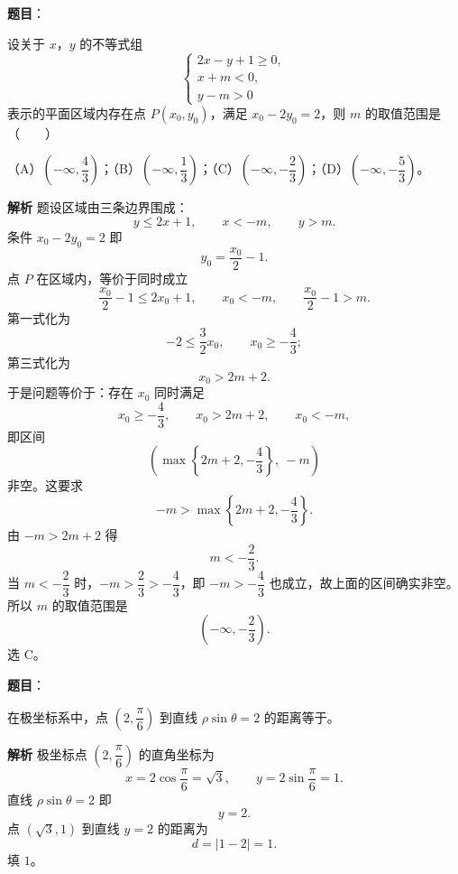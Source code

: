 \begin{answer}

\textbf{题目}：

设关于 $x$，$y$ 的不等式组
\nopagebreak[4]
\[\begin{cases}2x-y+1\geqslant0,\\ x+m<0,\\ y-m>0\end{cases}\]
表示的平面区域内存在点 $P(x_0,y_0)$，满足 $x_0-2y_0=2$，则 $m$ 的取值范围是\mbox{（　　）}

（A）$\left(-\infty,\dfrac43\right)$；（B）$\left(-\infty,\dfrac13\right)$；（C）$\left(-\infty,-\dfrac23\right)$；（D）$\left(-\infty,-\dfrac53\right)$。

\textbf{解析}
题设区域由三条边界围成：
\nopagebreak[4]
\[y\leqslant2x+1,\qquad x<-m,\qquad y>m.\]
条件 $x_0-2y_0=2$ 即
\nopagebreak[4]
\[y_0=\frac{x_0}2-1.\]
点 $P$ 在区域内，等价于同时成立
\nopagebreak[4]
\[\frac{x_0}2-1\leqslant2x_0+1,\qquad x_0<-m,\qquad \frac{x_0}2-1>m.\]
第一式化为
\nopagebreak[4]
\[-2\leqslant\frac32x_0,\qquad x_0\geqslant-\frac43;\]
第三式化为
\nopagebreak[4]
\[x_0>2m+2.\]
于是问题等价于：存在 $x_0$ 同时满足
\nopagebreak[4]
\[x_0\geqslant-\frac43,\qquad x_0>2m+2,\qquad x_0<-m,\]
即区间
\nopagebreak[4]
\[\left(\max\left\{2m+2,-\frac43\right\},\ -m\right)\]
非空。这要求
\nopagebreak[4]
\[-m>\max\left\{2m+2,-\frac43\right\}.\]
由 $-m>2m+2$ 得
\nopagebreak[4]
\[m<-\frac23.\]
当 $m<-\dfrac23$ 时，$-m>\dfrac23>-\dfrac43$，即 $-m>-\dfrac43$ 也成立，故上面的区间确实非空。所以 $m$ 的取值范围是
\nopagebreak[4]
\[\left(-\infty,-\frac23\right).\]
选 C。


\end{answer}
\begin{answer}

\textbf{题目}：

在极坐标系中，点 $\left(2,\dfrac{\pi}6\right)$ 到直线 $\rho\sin\theta=2$ 的距离等于\gkblank{}。

\textbf{解析}
极坐标点 $\left(2,\dfrac{\pi}6\right)$ 的直角坐标为
\nopagebreak[4]
\[x=2\cos\frac{\pi}6=\sqrt3,\qquad y=2\sin\frac{\pi}6=1.\]
直线 $\rho\sin\theta=2$ 即
\nopagebreak[4]
\[y=2.\]
点 $(\sqrt3,1)$ 到直线 $y=2$ 的距离为
\nopagebreak[4]
\[d=|1-2|=1.\]
填 $1$。


\end{answer}
